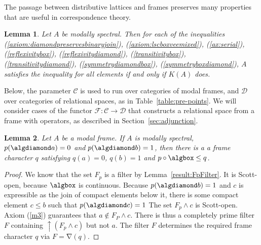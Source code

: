 \documentclass{article}[a4paper]
\newtheorem{lemma}{Lemma}%
\theoremstyle{definition}
\newcommand{\Ccal}{\mathcal{C}} %
\newcommand{\Dcal}{\mathcal{D}} %
\newcommand{\Fcal}{\mathcal{F}} %
\newcommand{\relsp}{\mathbf{RelSp}}
\newcommand{\relspl}{\mathbf{RelSp^l}}
\newcommand{\relspq}{\mathbf{RelSpq}}
\newcommand{\relspqu}{\mathbf{RelSpq^u}}
\newcommand{\relspql}{\mathbf{RelSpq^l}}
\newcommand{\relspqc}{\mathbf{RelSpq^c}}
\newcommand{\eqspq}{\mathbf{EqSpq}}
\newcommand{\mfrm}{\mathbf{MFrm}}
\newcommand{\mfrms}{\mathbf{MFrm}^{\scalebox{.5}{\algbox\!\!\!\algdiamond}}}
\newcommand{\mfrmbs}{\mathbf{MFrm}^{\scalebox{.5}{\algbox}}}
\newcommand{\mfrmds}{\mathbf{MFrm}^{\scalebox{.5}{\algdiamond}}}
\newcommand{\eqfrm}{\mathbf{EqFrm}}
\DeclareMathOperator{\charop}{\nabla}
\DeclareMathOperator{\upset}{\uparrow}
\begin{document}
The passage between distributive lattices and frames preserves many properties that are useful in correspondence theory.
\begin{lemma}
Let $A$ be modally spectral. Then for each of the inequalities 
(\ref{axiom:diamondpreservesbinaryjoin}),
(\ref{axiom:lscboxveemixed}), 
(\ref{ax:serial}), 
(\ref{reflexivitybox}),
(\ref{reflexivitydiamond}),
(\ref{transitivitybox}),
(\ref{transitivitydiamond}),
(\ref{symmetrydiamondbox}),
(\ref{symmetryboxdiamond}), 
$A$ satisfies the inequality for all elements if and only if $K(A)$ does.
\end{lemma}


Below, the parameter $\Ccal$ is used to run over categories of modal frames, and $\Dcal$ over ccategories of relational spaces, as in Table~\ref{table:pre-points}.
We will consider cases of the functor 
$\Fcal: \Ccal \longrightarrow \Dcal$ 
that constructs a relational space from a frame with operators, as described in Section~\ref{sec:adjunction}. 

\begin{lemma}
\label{result:relatedCharacterExists}
    Let $A$ be a modal frame. 
    If $A$ is modally spectral, $p(\algdiamond a) = 0$ and $p(\algdiamond b) = 1$, then there is a a frame character $q$ satisfying $q(a) = 0$, $q(b)=1$ and $p \circ \algbox \leq q$.
\end{lemma}

\begin{proof}
We know that the set $F_p$ is a filter by Lemma~\ref{result:FpFilter}. It is Scott-open, because $\algbox$ is continuous. 
Because $p(\algdiamond b)=1$ and $c$ is expressible as the join of compact elements below it, there is some compact element $c \leq b$ such that $p(\algdiamond c)=1$
The set $F_p \wedge c$ is Scott-open. Axiom (\ref{m3}) guarantees that $a \notin F_P \wedge c$. There is thus a completely prime filter $F$ containing $\upset(F_p \wedge c)$ but not $a$. The filter $F$ determines the required frame character $q$ via $F = \charop(q)$.
\end{proof}
\end{document}
